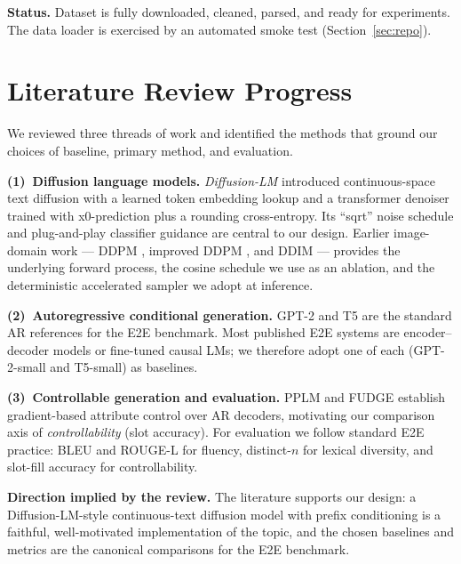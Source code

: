 \documentclass[11pt,a4paper]{article}
\begin{document}
\textbf{Status.} Dataset is fully downloaded, cleaned, parsed, and ready for
experiments. The data loader is exercised by an automated smoke test
(Section~\ref{sec:repo}).

\section{Literature Review Progress}

We reviewed three threads of work and identified the methods that ground our
choices of baseline, primary method, and evaluation.

\textbf{(1)~Diffusion language models.}
\emph{Diffusion-LM} \cite{li2022diffusionlm} introduced continuous-space
text diffusion with a learned token embedding lookup and a transformer
denoiser trained with x0-prediction plus a rounding cross-entropy. Its
``sqrt'' noise schedule and plug-and-play classifier guidance are central to
our design. Earlier image-domain work --- DDPM \cite{ho2020ddpm}, improved
DDPM \cite{nichol2021improved}, and DDIM \cite{song2021ddim} --- provides the
underlying forward process, the cosine schedule we use as an ablation, and
the deterministic accelerated sampler we adopt at inference.

\textbf{(2)~Autoregressive conditional generation.}
GPT-2 \cite{radford2019gpt2} and T5 \cite{raffel2020t5} are the standard AR
references for the E2E benchmark. Most published E2E systems are encoder--
decoder models or fine-tuned causal LMs; we therefore adopt one of each
(GPT-2-small and T5-small) as baselines.

\textbf{(3)~Controllable generation and evaluation.}
PPLM \cite{dathathri2020pplm} and FUDGE \cite{yang2021fudge} establish
gradient-based attribute control over AR decoders, motivating our
comparison axis of \emph{controllability} (slot accuracy). For evaluation
we follow standard E2E practice: BLEU \cite{papineni2002bleu} and ROUGE-L
\cite{lin2004rouge} for fluency, distinct-$n$ \cite{li2016diversity} for
lexical diversity, and slot-fill accuracy for controllability.

\textbf{Direction implied by the review.}
The literature supports our design: a Diffusion-LM-style continuous-text
diffusion model with prefix conditioning is a faithful, well-motivated
implementation of the topic, and the chosen baselines and metrics are the
canonical comparisons for the E2E benchmark.

\end{document}

